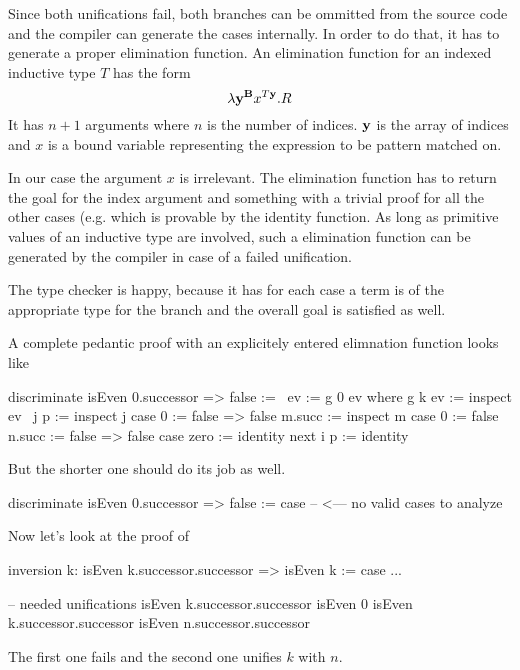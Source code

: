 Since both unifications fail, both branches can be ommitted from the source code
and the compiler can generate the cases internally. In order to do that, it has
to generate a proper elimination function. An elimination function for an
indexed inductive type $T$ has the form
$$
    \lambda \mathbf{y}^{\mathbf{B}} x^{T \mathbf{y}}. R
$$
It has $n + 1$ arguments where $n$ is the number of indices. $\mathbf{y}$ is the
array of indices and $x$ is a bound variable representing the expression to be
pattern matched on.

In our case the argument $x$ is irrelevant. The elimination function has to
return the goal  for the index argument  and
something with a trivial proof for all the other cases (e.g. 
which is provable by the identity function. As long as primitive values of an
inductive type are involved, such a elimination function can be generated by the
compiler in case of a failed unification.

The type checker is happy, because it has for each case a term is of the
appropriate type for the branch and the overall goal is satisfied as well.

A complete pedantic proof with an explicitely entered elimnation function looks
like
\begin{alba}
    discriminate isEven 0.successor => false :=
        \ ev := g 0 ev where
            g k ev :=
                inspect
                    ev
                    \ j p := inspect j case
                        0 := false => false
                        m.succ :=
                            inspect m case
                                0 := false
                                n.succ := false => false
                case
                    zero :=
                        identity
                    next i p :=
                        identity
\end{alba}
But the shorter one should do its job as well.
\begin{alba}
    discriminate isEven 0.successor => false :=
        case --  <--- no valid cases to analyze
\end{alba}

\vskip 5mm
Now let's look at the proof of

\begin{alba}
    inversion k: isEven k.successor.successor => isEven k :=
        case ...

    -- needed unifications
    isEven k.successor.successor        isEven 0
    isEven k.successor.successor        isEven n.successor.successor
\end{alba}
The first one fails and the second one unifies $k$ with $n$.




